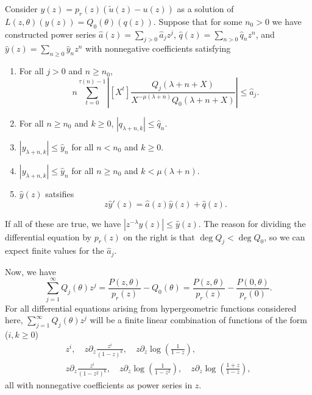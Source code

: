 \documentclass[12pt]{article}
\numberwithin{equation}{section}
\begin{document}
Consider
$y(z) = p_r(z)(\tilde{u}(z) - u(z))$ as a solution of $L(z, \theta)(y(z)) = Q_0(\theta)(q(z))$. Suppose that for some $n_0 > 0$ we have constructed power series $\hat{a}(z) = \sum_{j>0} \hat{a}_j z^j$, $\hat{q}(z)  = \sum_{n>0} \hat{q}_n z^n$, and $\hat{y}(z) = \sum_{n \ge 0} \hat{y}_n z^n$ with nonnegative coefficients satisfying
\begin{enumerate}
\item For all $j > 0$ and $n \ge n_0$,
\begin{equation*}
n \sum_{t=0}^{\tau(n) - 1} \left| [X^t] \frac{Q_j(\lambda+n+X)}{X^{-\mu(\lambda+n)}Q_0(\lambda+n+X)} \right| \le  \hat{a}_j \text{.}
\end{equation*}
\item For all $n \ge n_0$ and $k \ge 0$, $| q_{\lambda+n,k}| \le \hat{q}_n$.
\item $|y_{\lambda+n,k}| \le \hat{y}_n$ for all $n < n_0$ and $k \ge 0$.
\item $|y_{\lambda+n,k}| \le \hat{y}_n$ for all $n \ge n_0$ and $k < \mu(\lambda + n)$.
\item $\hat{y}(z)$ satsifies
\begin{equation*}
z \hat{y}'(z) = \hat{a}(z) \hat{y}(z) + \hat{q}(z)\text{.}
\end{equation*}
\end{enumerate}
If all of these are true, we have $|z^{-\lambda} y(z)| \le \hat{y}(z)$. The reason for dividing the differential equation by $p_r(z)$ on the right is that $\deg Q_j < \deg Q_0$, so we can expect finite values for the $\hat{a}_j$.

Now, we have
\begin{equation*}
\sum_{j=1}^{\infty} Q_j(\theta) z^j = \frac{P(z,\theta)}{p_r(z)} - Q_0(\theta)
= \frac{P(z,\theta)}{p_r(z)} - \frac{P(0,\theta)}{p_r(0)} \text{.}
\end{equation*}
For all differential equations arising from hypergeometric functions considered here, $\sum_{j=1}^{\infty} Q_j(\theta) z^j$ will be a finite linear combination of functions of the form ($i, k \ge 0$)
\begin{gather*}
z^i, \quad z \partial_z \frac{z^i}{(1-z)^k}, \quad
z \partial_z \log \left( \frac{1}{1-z} \right),\\
z \partial_z \frac{z^i}{(1-z^2)^k}, \quad
z \partial_z \log \left( \frac{1}{1-z^2} \right), \quad
z \partial_z \log \left( \frac{1+z}{1-z} \right),
\end{gather*}
all with nonnegative coefficients as power series in $z$.
\end{document}
